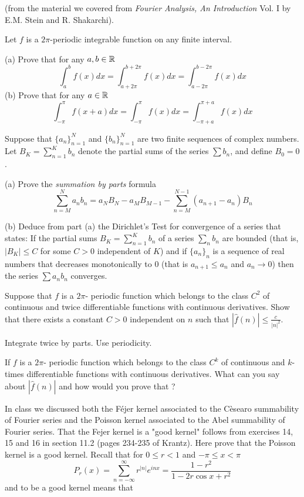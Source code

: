 \enddocument


\smallskip
{ (from the material we covered from {\it Fourier Analysis, An Introduction} Vol. I by E.M. Stein and R. Shakarchi).

\smallskip

  Let $f$ is a $2\pi$-periodic integrable function on any finite interval.

(a) Prove  that for any $a, b \in \Bbb R$ 
$$  \int_a^b f(x) d x  = \int_{a+ 2\pi}^{b+2\pi} f(x) dx = \int_{a- 2\pi}^{b -2\pi} f(x) dx $$
(b) Prove  that for any $a \in \Bbb R$ $$  \int_{-\pi}^{\pi} f(x+a) d x  = \int_{-\pi}^{\pi} f(x) dx = \int_{- \pi +a }^{\pi+a} f(x) dx $$

\medskip

  Suppose that  $\{a_n\}_{n=1}^N$ and $\{b_n\}_{n=1}^N$ are two finite sequences of complex numbers. Let $B_K = \sum_{n=1}^K  b_n$ denote the partial sums of the series $\sum b_n$, and define $B_0=0$. 

(a)  Prove the {\it summation by parts} formula 
$$\sum_{n=M}^N   a_n b_n = a_N B_N - a_M B_{M-1} - \sum_{n=M}^{N-1}  (a_{n+1} - a_n) B_n $$

\smallskip

(b)  Deduce from part (a) the Dirichlet's Test for convergence of a series that states:  If the partial sums $B_K =\sum_{n=1}^K  b_n $    of a series $\sum_n  b_n $ are bounded  (that is, $| B_K| \leq C$ for some $C>0$ independent of $K$) and  if  $\{a_n\}_n$ is a sequence of real numbers that decreases monotonically to $0$ (that is $a_{n+1} \leq a_n$ and 
$a_n \to 0$) then  the series $\sum a_n b_n$ converges.

\medskip

  Suppose that $f$ is a $2\pi$- periodic function which belongs to the class $C^2$ of continuous and twice differentiable functions 
with continuous derivatives.  Show that  there exists a constant $C>0$  independent on $n$ such that $ |\widehat{f}(n)| \leq \frac{c}{|n|^2} $.

 Integrate twice by parts. Use periodicity.

If $f$ is a $2\pi$- periodic function which belongs to the class $C^k$ of continuous and $k$-times differentiable functions 
with continuous derivatives.  What can you say about $|\widehat{f}(n)| $ and how would you prove that ?


\medskip
{}   In class we discussed both the F\'ejer kernel associated to the C\`esearo summability of Fourier series and the Poisson 
kernel associated to the Abel summability of Fourier series.  That the Fejer kernel is a "good kernel" follows from exercises 14, 15 and 16 in section 11.2 (pages 234-235 of Krantz).  Here prove that the Poisson kernel is a good kernel.  Recall that for $0 \leq r < 1$ and $ -\pi \leq x < \pi $
$$  P_r(x) = \sum_{n=-\infty}^{\infty}  r^{|n|} e^{i n x} = \frac{1 - r^2}{ 1 - 2 r \cos x + r^2} $$ and to be a good kernel means that 
\smallskip

}

